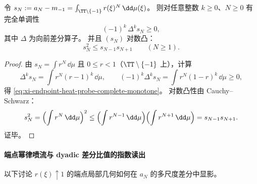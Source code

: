 
\begin{proposition}\label{prop:xi-endpoint-heat-probe-complete-monotone-logconvex}
令 \(s_N:=a_N-m_{-1}=\int_{\TT\setminus\{-1\}}r(\xi)^N\,\dd\mu(\xi)\)。
则对任意整数 \(k\ge 0\)、\(N\ge 0\) 有完全单调性
\begin{equation}\label{eq:xi-endpoint-heat-probe-complete-monotone}
\boxed{\;(-1)^k\,\Delta^k s_N\ge 0,\;}
\end{equation}
其中 \(\Delta\) 为向前差分算子。
并且 \((s_N)\) 对数凸：
\begin{equation}\label{eq:xi-endpoint-heat-probe-logconvex}
\boxed{\;s_N^2\le s_{N-1}s_{N+1}\qquad(N\ge 1).\;}
\end{equation}
\end{proposition}
\begin{proof}
由 \(s_N=\int r^N\,\dd\mu\) 且 \(0\le r<1\)（\(\TT\setminus\{-1\}\) 上），计算
\[
\Delta^k s_N=\int r^N(r-1)^k\,\dd\mu,
\qquad
(-1)^k\Delta^k s_N=\int r^N(1-r)^k\,\dd\mu\ge 0,
\]
得 \eqref{eq:xi-endpoint-heat-probe-complete-monotone}。
对数凸性由 Cauchy--Schwarz：
\[
s_N^2=\Bigl(\int r^N\,\dd\mu\Bigr)^2
\le \Bigl(\int r^{N-1}\,\dd\mu\Bigr)\Bigl(\int r^{N+1}\,\dd\mu\Bigr)=s_{N-1}s_{N+1}.
\]
证毕。
\end{proof}

\paragraph{端点幂律喷流与 dyadic 差分比值的指数读出}
以下讨论 \(r(\xi)\uparrow 1\) 的端点局部几何如何在 \(a_N\) 的多尺度差分中显影。

